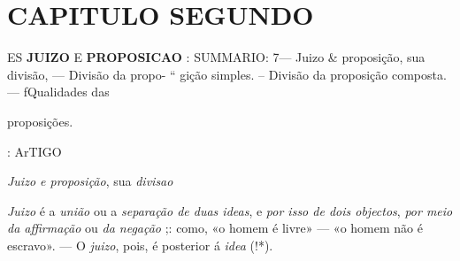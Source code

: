 
\chapter*{CAPITULO SEGUNDO}

 ES \textbf{JUIZO} E \textbf{PROPOSICAO} : \textsc{SUMMARIO}: 7--- Juizo \& proposição, sua divisão, --- Divisão da propo- “ gição simples. -- Divisão da proposição composta. --- fQualidades das

proposições.

: ArTIGO \textbar{}

\emph{Juizo e proposição}, sua \emph{divisao}


\emph{Juizo} é a \emph{união} ou a \emph{separação de duas ideas}, e \emph{por isso de dois objectos}, \emph{por meio da affirmação} ou \emph{da negação} ;: como, «o homem é livre» --- «o homem não é escravo». --- O \emph{juizo}, pois, é posterior á \emph{idea} (!*).


